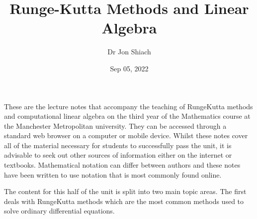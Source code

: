 \documentclass[letterpaper,10pt,english]{jupyterBook}
\title{Runge-Kutta Methods and Linear Algebra}
\date{Sep 05, 2022}
\author{Dr Jon Shiach}
\begin{document}
\pagestyle{empty}
\sphinxmaketitle
\pagestyle{plain}
\sphinxtableofcontents
\pagestyle{normal}
\label{\detokenize{intro::doc}}


\sphinxAtStartPar
These are the lecture notes that accompany the teaching of Runge\sphinxhyphen{}Kutta methods and computational linear algebra on the third year of the Mathematics course at the Manchester Metropolitan university. They can be accessed through a standard web browser on a computer or mobile device. Whilst these notes cover all of the material necessary for students to successfully pass the unit, it is advisable to seek out other sources of information either on the internet or textbooks. Mathematical notation can differ between authors and these notes have been written to use notation that is most commonly found online.

\begin{DUlineblock}{0em}
\item[] 
\end{DUlineblock}

\sphinxAtStartPar
The content for this half of the unit is split into two main topic areas. The first deals with Runge\sphinxhyphen{}Kutta methods which are the most common methods used to solve ordinary differential equations.
\end{document}
